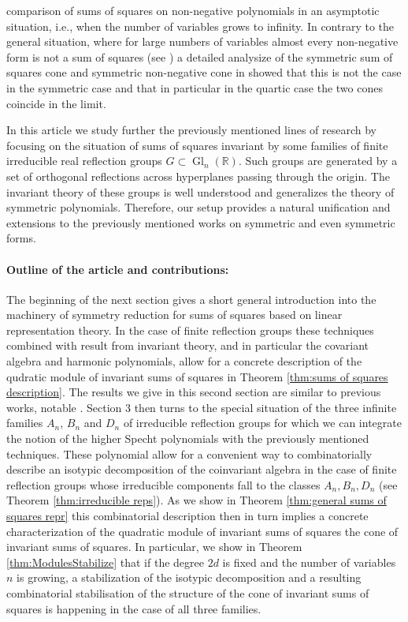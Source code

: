 \documentclass[11pt,a4paper]{amsart}
\numberwithin{equation}{section}
\theoremstyle{definition}
\newcommand{\R}{\mathbb{R}}
\DeclareMathOperator{\Gl}{Gl}
\numberwithin{thm}{section}
\theoremstyle{break}
\numberwithin{subcase}{case}
\begin{document}
comparison of sums of squares on non-negative polynomials in an  asymptotic situation, i.e., when the number of variables grows to infinity.  In contrary to the general situation, where for large numbers of variables almost every non-negative form is not a sum of squares (see \cite{blekherman2006there}) a detailed analysize of the symmetric sum of squares cone and symmetric non-negative cone in \cite{blekrie} showed that this is not the case in the symmetric case and that in particular in the quartic case the two cones coincide in the limit.

In this article we study further the previously mentioned lines of research by focusing on the situation of sums of squares invariant by some families of finite irreducible real reflection groups $G\subset \Gl_n(\R)$. Such  groups  are generated by a set of orthogonal reflections across hyperplanes passing through the origin. The invariant theory of these groups is well understood and  generalizes the theory of symmetric polynomials. Therefore, our setup provides a natural unification and extensions to the previously mentioned works on symmetric and even symmetric forms.  

\smallskip
\paragraph{\bf Outline of the article and contributions:} The beginning of the next section gives a short general introduction into the machinery of symmetry reduction for sums of squares  based on linear representation theory. In the case of finite reflection groups these techniques combined with result from invariant theory, and in particular the covariant algebra and harmonic polynomials,  allow for a concrete description of the qudratic module of invariant sums of squares in Theorem \ref{thm:sums of squares description}. The results we give in this second section are similar to previous works, notable \cite{blekrie,valentin,gatermann2004symmetry,vallentin2009symmetry}. Section 3 then turns to the special situation of the three infinite families $A_n$, $B_n$ and $D_n$ of irreducible reflection groups for which we can integrate the notion of the higher Specht polynomials \cite{ariki1997higher} with the previously  mentioned techniques. These polynomial allow for  a convenient way to combinatorially describe an isotypic decomposition  of the coinvariant algebra in the case of finite reflection groups whose irreducible components fall to the classes $A_{n},B_n,D_n$ (see Theorem \ref{thm:irreducible reps}). As we show in Theorem \ref{thm:general sums of squares repr} this combinatorial description then in turn implies a concrete characterization of the quadratic module of invariant sums of squares the cone of invariant sums of squares. In particular, we show in Theorem \ref{thm:ModulesStabilize} that if the degree $2d$ is fixed and the number of variables $n$ is growing, a stabilization of the isotypic decomposition and a resulting combinatorial stabilisation of the structure of the cone of invariant sums of squares is happening in the case of all three families.   
\end{document}

